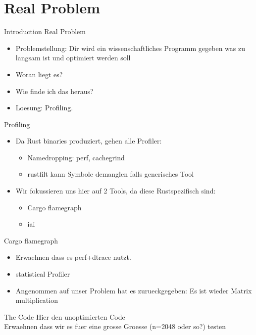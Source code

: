 \documentclass[compress,aspectratio=169]{beamer}
\begin{document}
\section{Real Problem}

\begin{frame}{Introduction Real Problem}
  \begin{itemize}
    \item Problemstellung: Dir wird ein wissenschaftliches Programm gegeben was zu langsam ist und optimiert werden soll
    \item Woran liegt es?
    \item Wie finde ich das heraus?
    \item Loesung: Profiling.
  \end{itemize}
\end{frame}

\begin{frame}{Profiling}
  \begin{itemize}
    \item Da Rust binaries produziert, gehen alle Profiler:
      \begin{itemize}
        \item Namedropping: perf, cachegrind
        \item rustfilt kann Symbole demanglen falls generisches Tool
      \end{itemize}
    \item Wir fokussieren uns hier auf 2 Tools, da diese Rustspezifisch sind:
      \begin{itemize}
        \item Cargo flamegraph
        \item iai
      \end{itemize}
  \end{itemize}
\end{frame}

\begin{frame}{Cargo flamegraph}
  \begin{itemize}
    \item Erwaehnen dass es perf+dtrace nutzt.
    \item statistical Profiler
    \item Angenommen auf unser Problem hat es zurueckgegeben: Es ist wieder Matrix multiplication
  \end{itemize}
\end{frame}

\begin{frame}{The Code}
  Hier den unoptimierten Code\\
  Erwaehnen dass wir es fuer eine grosse Groesse (n=2048 oder so?) testen
\end{frame}
\end{document}
